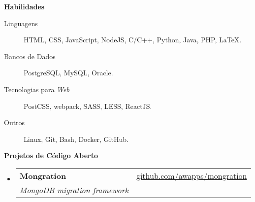 \documentclass[letterpaper,11pt]{article}
\makeatletter
\newcommand{\resheading}[1]{{\large \colorbox{mygrey}{\begin{minipage}{\textwidth}{\textbf{#1 \vphantom{p\^{E}}}}\end{minipage}}}}
\newcommand{\ressubheading}[4]{
\begin{tabular*}{7.0in}{l@{\extracolsep{\fill}}r}
    \textbf{#1} & #2 \\
    \textit{#3} & \textit{#4} \\
\end{tabular*}\vspace{-6pt}}
\makeatother
\begin{document}
    \resheading{Habilidades}
    \begin{description}
        \item[Linguagens]
            HTML, CSS, JavaScript, NodeJS, C/C++, Python, Java, PHP, \LaTeX.
        \item[Bancos de Dados]
            PostgreSQL, MySQL, Oracle.
        \item[Tecnologias para \textit{Web}]
            PostCSS, webpack, SASS, LESS, ReactJS.
        \item[Outros]
            Linux, Git, Bash, Docker, GitHub.
    \end{description}

    \resheading{Projetos de Código Aberto}
    \begin{itemize}
        \item
            \ressubheading
                {Mongration}
                {\href{https://github.com/awapps/mongration}{github.com/awapps/mongration}}
                {MongoDB migration framework}
                {}
    \end{itemize}
\end{document}
